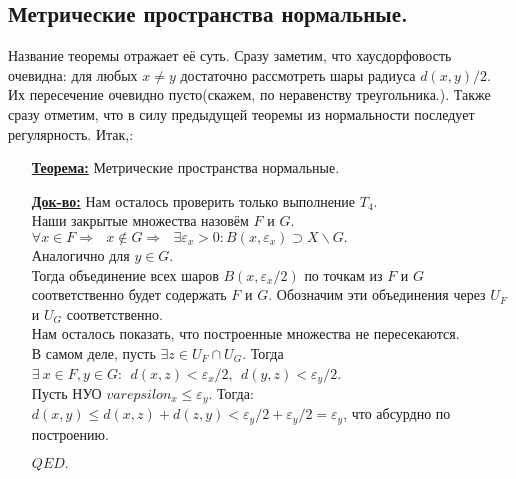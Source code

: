 \documentclass[10pt]{report}
\begin{document}
\begin{spacing}{1.5}
\subsection{Метрические пространства нормальные.}
Название теоремы отражает её суть. Сразу заметим, что хаусдорфовость очевидна: для любых $x\neq y$ достаточно рассмотреть шары радиуса $d(x, y)/2$. Их пересечение очевидно пусто(скажем, по неравенству треугольника.). Также сразу отметим, что в силу предыдущей теоремы из нормальности последует регулярность.
Итак,:
\begin{enumerate}
\item[\textbf{\underline{Теорема:}}] Метрические пространства нормальные.
\item[\textbf{\underline{Док-во:}}] Нам осталось проверить только выполнение $T_{4}$.\\
Наши закрытые множества назовём $F$ и $G$. \\
$\forall x\in F\Longrightarrow~~~x\notin G\Longrightarrow~~~\exists\varepsilon_{x}>0: B(x, \varepsilon_{x})\supset X\backslash G.$\\
Аналогично для $y\in G$.\\
Тогда объединение всех шаров $B(x, \varepsilon_{x}/2)$ по точкам из $F$ и $G$ соответственно будет содержать $F$ и $G$. Обозначим эти объединения через $U_{F}$ и $U_{G}$ соответственно.\\
Нам осталось показать, что построенные множества не пересекаются.
\\ В самом деле, пусть $\exists z\in U_{F}\cap U_{G}$. Тогда $\exists~ x\in F, y\in G:~~ d(x, z)<\varepsilon_{x}/2,~~ d(y, z)<\varepsilon_{y}/2$.\\
Пусть НУО $varepsilon_{x}\leq \varepsilon_{y}$. Тогда:\\
$d(x, y)\leq d(x, z)+d(z, y)<\varepsilon_{y}/2+\varepsilon_{y}/2=\varepsilon_{y}$, что абсурдно по построению.
\begin{flushright}
$QED.$
\end{flushright}
\end{enumerate}

\end{spacing}
\end{document}
